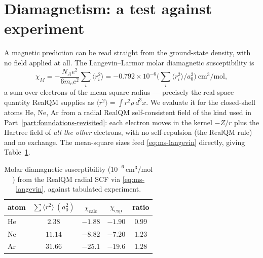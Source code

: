 \section{Diamagnetism: a test against experiment}\label{sec:diamagnetism}

A magnetic prediction can be read straight from the ground-state density, with no field applied at all. The
Langevin--Larmor molar diamagnetic susceptibility is
\begin{equation}
\chi_M = -\frac{N_A e^2}{6 m_e c^2}\sum_i \langle r_i^2\rangle
       = -0.792\times 10^{-6}\Big(\textstyle\sum_i \langle r_i^2\rangle / a_0^2\Big)\ \mathrm{cm^3/mol},
\label{eq:ms-langevin}
\end{equation}
a sum over electrons of the mean-square radius --- precisely the real-space quantity RealQM supplies as
$\langle r^2\rangle = \int r^2\rho\, d^3x$. We evaluate it for the closed-shell atoms He, Ne, Ar from a radial
RealQM self-consistent field of the kind used in Part~\ref{part:foundations-revisited}: each electron moves in
the kernel $-Z/r$ plus the Hartree field of \emph{all the other} electrons, with no self-repulsion (the RealQM
rule) and no exchange. The mean-square sizes feed \eqref{eq:ms-langevin} directly, giving
Table~\ref{tab:ms-dia}.

\begin{table}[h]
\centering
\begin{tabular}{lcccc}
\toprule
atom & $\sum\langle r^2\rangle\ (a_0^2)$ & $\chi_{\text{calc}}$ & $\chi_{\text{exp}}$ & ratio \\
\midrule
He & $2.38$  & $-1.88$ & $-1.90$ & $0.99$ \\
Ne & $11.14$ & $-8.82$ & $-7.20$ & $1.23$ \\
Ar & $31.66$ & $-25.1$ & $-19.6$ & $1.28$ \\
\bottomrule
\end{tabular}
\caption{Molar diamagnetic susceptibility ($10^{-6}\,\mathrm{cm^3/mol}$) from the RealQM radial SCF via
\eqref{eq:ms-langevin}, against tabulated experiment.}
\label{tab:ms-dia}
\end{table}

